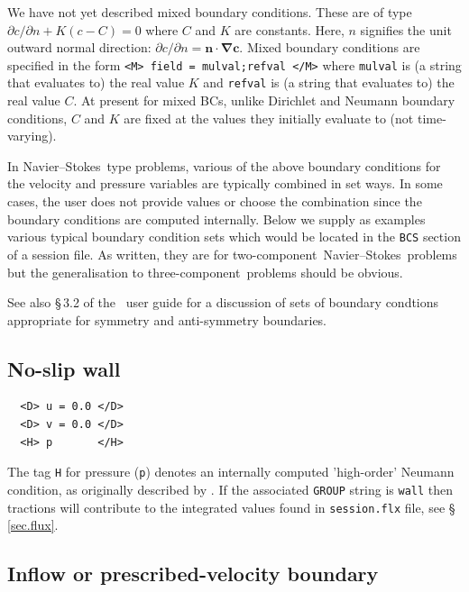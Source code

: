 \documentclass[11pt]{report}
\newcommand\twoc{two-com\-po\-nent}
\newcommand\threec{three-com\-po\-nent}
\newcommand\NavSto{Navier--Stokes}
\begin{document}
We have not yet described mixed boundary conditions.  These are of
type $\partial c/\partial n+K(c-C)=0$ where $C$ and $K$ are constants.
Here, $n$ signifies the unit outward normal direction: $\partial
c/\partial n=\bm{n\cdot\nabla c}$.  Mixed boundary conditions are
specified in the form \verb|<M> field = mulval;refval </M>| where
\verb|mulval| is (a string that evaluates to) the real value $K$ and
\verb+refval+ is (a string that evaluates to) the real value $C$.  At
present for mixed BCs, unlike Dirichlet and Neumann boundary
conditions, $C$ and $K$ are fixed at the values they initially
evaluate to (not time-varying).

In \NavSto\ type problems, various of the above boundary conditions
for the velocity and pressure variables are typically combined in set
ways.  In some cases, the user does not provide values or choose the
combination since the boundary conditions are computed internally.
Below we supply as examples various typical boundary condition sets
which would be located in the \verb+BCS+ section of a session file.
As written, they are for \twoc\ \NavSto\ problems but the
generalisation to \threec\ problems should be obvious.

See also \S\,3.2 of the \Dog\ user guide for a discussion of sets of
boundary condtions appropriate for symmetry and anti-symmetry
boundaries.

\subsection{No-slip wall}

{\small
\begin{verbatim}
  <D> u = 0.0 </D>
  <D> v = 0.0 </D>
  <H> p       </H>
\end{verbatim}
}
\noindent The tag \verb+H+ for pressure (\verb+p+) denotes an
internally computed 'high-order' Neumann condition, as originally
described by \citet{kio91}.  If the associated \verb|GROUP| string is
\verb|wall| then tractions will contribute to the integrated values
found in \verb+session.flx+ file, see \S\,\ref{sec.flux}.

\subsection{Inflow or prescribed-velocity boundary}
\end{document}
